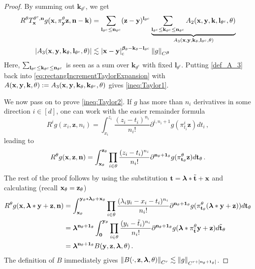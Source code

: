 \documentclass[12pt]{article}
\numberwithin{equation}{section}
\theoremstyle{plain}
\theoremstyle{definition}
\newcommand{\abs}[1]{\left\vert #1 \right\vert}
\newcommand{\norm}[1]{\left\Vert #1\right\Vert}
\def\fk{\mathbf k}\def\fl{\mathbf l}
\def\fy{\mathbf y}\def\fz{\mathbf z}
\def\fbeta{{\boldsymbol\beta}}
\def\flambda{{\boldsymbol\lambda}}
\def\foo{{\boldsymbol 0}}
\def\fone{{\boldsymbol 1}}
\begin{document}
\begin{proof}
    By summing out $\fk_{\theta^c}$, we get
    \begin{align}\begin{split}\label{def_A_3}
        R^\theta T_\fx^{\theta^c,\fn} g(\fx,\pi^\theta_\fy \fz,\fn-\fk) &= \sum_{\fl_{\theta^c}\le\fn_{\theta^c}} (\fz-\fy)^{\fl_{\theta^c}}\underbrace{\sum_{\fl_{\theta^c}\le\fk_{\theta^c}\le\fn_{\theta^c}}A_2(\fx,\fy,\fk,\fl_{\theta^c},\theta)}_{A_3(\fx,\fy,\fk_{\theta},\fl_{\theta^c},\theta)}\\
        \abs{A_3(\fx,\fy,\fk_\theta,\fl_{\theta^c},\theta)} &\lesssim \abs{\fx-\fy}^{\fbeta_\theta-\fk_\theta-\fl_{\theta^c}}_{\text{c}} \norm{g}_{C^\fbeta}
    \end{split}\end{align}
    Here, $\sum_{\fl_{\theta^c}\le\fk_{\theta^c}\le\fn_{\theta^c}}$ is seen as a sum over $\fk_{\theta^c}$ with fixed $\fl_{\theta^c}$. Putting \eqref{def_A_3} back into \eqref{eq:rectangIncrementTaylorExpansion} with $A(\fx,\fy,\fk,\theta) := A_3(\fx,\fy,\fk_\theta,\fk_{\theta^c},\theta)$ gives \eqref{ineq:Taylor1}.

    We now pass on to prove \eqref{ineq:Taylor2}. If $g$ has more than $n_i$ derivatives in some direction $i\in[d]$, one can work with the easier remainder formula 
    \begin{equation}
        R^ig(x_i,\fz,n_i) =\int_{x_i}^{z_i} \frac{(z_i-t_i)^{n_i}}{n_i!} \partial^{i,n_i+1} g(\pi^i_{t_i}\fz) dt_i\,,
    \end{equation}
    leading to
    \begin{equation}
        R^\theta g(\fx,\fz,\fn) = \int_{\fx_\theta}^{\fz_\theta} \prod_{i\in\theta}\frac{(z_i-t_i)^{n_i}}{n_i!} \partial^{\fn_\theta+\fone_\theta} g(\pi_{\ft_\theta}^\theta \fz) d\ft_\theta\,.
    \end{equation}
    The rest of the proof follows by using the substitution $\ft = \flambda*\tilde\ft + \fx$ and calculating (recall $\fx_\theta = \fz_\theta$)
    \begin{align*}
    R^\theta g(\fx,\flambda*\fy+\fz,\fn) &= \int_{\fx_\theta}^{\fy_\theta*\flambda_\theta +\fx_\theta}\prod_{i\in\theta}\frac{(\lambda_i y_i -x_i-t_i)^{n_i}}{n_i!} \partial^{\fn_\theta+\fone_\theta} g(\pi^\theta_{\ft_\theta} (\flambda*\fy+\fz)) d\ft_\theta\\
    &= \flambda^{\fn_\theta+\fone_\theta} \int_\foo^{\fy_\theta} \prod_{i\in\theta}\frac{(y_i-\tilde t_i)^{n_i}}{n_i!} \partial^{\fn_\theta+\fone_\theta} g(\flambda*\pi^\theta_{\tilde\ft}\fy+\fz)d\tilde\ft_\theta\\
    &= \flambda^{\fn_\theta+\fone_\theta} B(\fy,\fz,\flambda,\theta)\,.
\end{align*}
The definition of $B$ immediately gives $\norm{B(\cdot,\fz,\flambda,\theta)}_{C^r} \lesssim \norm{g}_{C^{r+\abs{\fn_\theta+\fone_\theta}}}$.
\end{proof}
\end{document}

